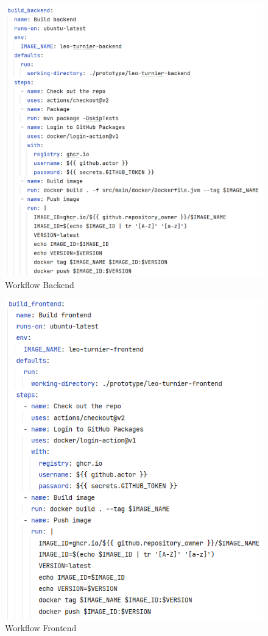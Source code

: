\begin{figure}[H]
    \includegraphics[scale=0.4]{pics/docker/workflow_backend.png}
    \caption{Workflow Backend}
\end{figure}

\begin{figure}[H]
    \includegraphics[scale=0.6]{pics/docker/workflow_frontend.png}
    \caption{Workflow Frontend}
\end{figure}

